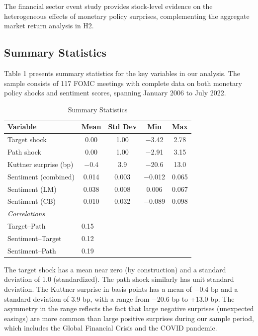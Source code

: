\documentclass[12pt]{article}
\begin{document}
The financial sector event study provides stock-level evidence on the heterogeneous effects of monetary policy surprises, complementing the aggregate market return analysis in H2.

\subsection{Summary Statistics}

Table 1 presents summary statistics for the key variables in our analysis. The sample consists of 117 FOMC meetings with complete data on both monetary policy shocks and sentiment scores, spanning January 2006 to July 2022.


\begin{table}[htbp]\centering\caption{Summary Statistics}\label{tab:summary}
\begin{tabular}{lcccc}\toprule
Variable & Mean & Std Dev & Min & Max \\\midrule
Target shock & 0.00 & 1.00 & $-$3.42 & 2.78 \\
Path shock & 0.00 & 1.00 & $-$2.91 & 3.15 \\
Kuttner surprise (bp) & $-$0.4 & 3.9 & $-$20.6 & 13.0 \\
Sentiment (combined) & 0.014 & 0.003 & $-$0.012 & 0.065 \\
Sentiment (LM) & 0.038 & 0.008 & 0.006 & 0.067 \\
Sentiment (CB) & 0.010 & 0.032 & $-$0.089 & 0.098 \\\midrule
\multicolumn{5}{l}{\textit{Correlations}} \\
Target--Path & \multicolumn{4}{l}{0.15} \\
Sentiment--Target & \multicolumn{4}{l}{0.12} \\
Sentiment--Path & \multicolumn{4}{l}{0.19} \\\bottomrule\end{tabular}
\par\vspace{2pt}{\footnotesize Sample: 117 FOMC meetings, January 2006 to July 2022. Target and path shocks are standardized to unit variance.}\end{table}


The target shock has a mean near zero (by construction) and a standard deviation of 1.0 (standardized). The path shock similarly has unit standard deviation. The Kuttner surprise in basis points has a mean of $-$0.4 bp and a standard deviation of 3.9 bp, with a range from $-$20.6 bp to +13.0 bp. The asymmetry in the range reflects the fact that large negative surprises (unexpected easings) are more common than large positive surprises during our sample period, which includes the Global Financial Crisis and the COVID pandemic.
\end{document}
